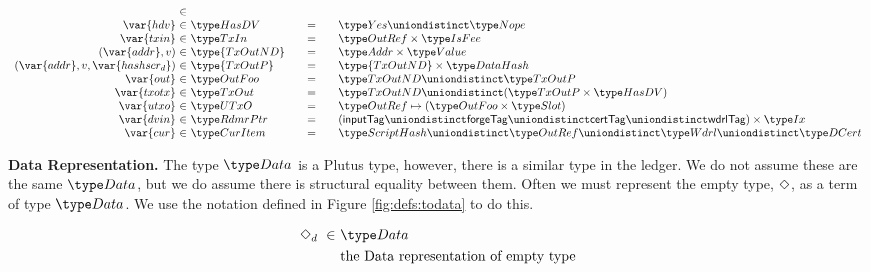 \begin{figure*}[htb]
\begin{equation*}
\begin{array}{r@{~\in~}l@{\qquad=\qquad}lr}
      \\
      \var{hdv}
      & \HasDV
      & \Yes \uniondistinct \Nope
      \\
      \var{txin}
      & \TxIn
      & \OutRef \times \IsFee
      \\
      (\var{addr}, v)
      & \type{TxOutND}
      & \Addr \times \Value
      \\
      (\var{addr}, v, \var{hashscr_d})
      & \type{TxOutP}
      & \type{TxOutND} \times \DataHash
      \\
      \var{out}
      & \OutFoo
      & \TxOutND \uniondistinct \TxOutP
      \\
      \var{txotx}
      & \TxOut
      & \TxOutND \uniondistinct (\TxOutP \times \HasDV)
      \\
      \var{utxo}
      & \UTxO
      & \OutRef \mapsto (\OutFoo \times \Slot)
      \\
      \var{dvin}
      & \RdmrPtr
      & (\mathsf{inputTag} \uniondistinct \mathsf{forgeTag} \uniondistinct
      \mathsf{certTag} \uniondistinct \mathsf{wdrlTag}) \times \Ix
      \\
      \var{cur}
      & \CurItem
      & \ScriptHash \uniondistinct \OutRef \uniondistinct \Wdrl \uniondistinct \DCert
    \end{array}
  \end{equation*}
  \caption{Definitions used in the UTxO transition system}
  \label{fig:defs:utxo-shelley-1}
\end{figure*}


\textbf{Data Representation.}
The type $\Data$ is a Plutus type, however, there is a similar type in the
ledger. We do not assume these are the same $\Data$, but we do assume there
is structural equality between them. Often we must represent the empty type,
$\Diamond$, as a term of type $\Data$. We use the notation defined in
Figure \ref{fig:defs:todata} to do this.

\begin{figure*}[htb]
  \begin{align*}
    \Nothing_d ~\in~& \Data \\
    & \text{the Data representation of empty type} \\
  \end{align*}
  \caption{Empty Data Representation}
  \label{fig:defs:todata}
\end{figure*}


